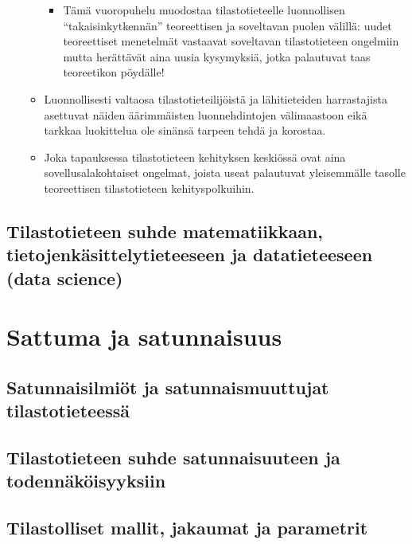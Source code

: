 \documentclass[
]{book}
\providecommand{\tightlist}{%
  \setlength{\itemsep}{0pt}\setlength{\parskip}{0pt}}
\begin{document}
\begin{itemize}
\begin{itemize}
    \begin{itemize}
    \tightlist
    \item
      Tämä vuoropuhelu muodostaa tilastotieteelle luonnollisen ``takaisinkytkennän'' teoreettisen ja soveltavan puolen välillä: uudet teoreettiset menetelmät vastaavat soveltavan tilastotieteen ongelmiin mutta herättävät aina uusia kysymyksiä, jotka palautuvat taas teoreetikon pöydälle!
    \end{itemize}
  \item
    Luonnollisesti valtaosa tilastotieteilijöistä ja lähitieteiden harrastajista asettuvat näiden äärimmäisten luonnehdintojen välimaastoon eikä tarkkaa luokittelua ole sinänsä tarpeen tehdä ja korostaa.
  \item
    Joka tapauksessa tilastotieteen kehityksen keskiössä ovat aina sovellusalakohtaiset ongelmat, joista useat palautuvat yleisemmälle tasolle teoreettisen tilastotieteen kehityspolkuihin.
  \end{itemize}
\end{itemize}

\hypertarget{tilastotieteen-suhde-matematiikkaan-tietojenkuxe4sittelytieteeseen-ja-datatieteeseen-data-science}{%
\section{Tilastotieteen suhde matematiikkaan, tietojenkäsittelytieteeseen ja datatieteeseen (data science)}\label{tilastotieteen-suhde-matematiikkaan-tietojenkuxe4sittelytieteeseen-ja-datatieteeseen-data-science}}

\hypertarget{luku4}{%
\chapter{Sattuma ja satunnaisuus}\label{luku4}}

\hypertarget{alaluku41}{%
\section{Satunnaisilmiöt ja satunnaismuuttujat tilastotieteessä}\label{alaluku41}}

\hypertarget{alaluku42}{%
\section{Tilastotieteen suhde satunnaisuuteen ja todennäköisyyksiin}\label{alaluku42}}

\hypertarget{alaluku43}{%
\section{Tilastolliset mallit, jakaumat ja parametrit}\label{alaluku43}}
\end{document}
